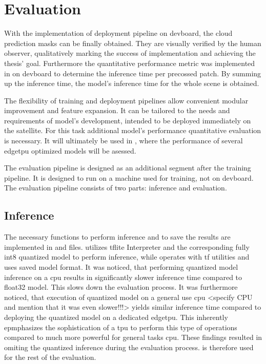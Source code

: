 {\section{Evaluation}
\label{sec:evaluation}

With the implementation of deployment pipeline on \gls{devboard}, the cloud prediction masks can be finally obtained.
They are visually verified by the human observer, qualitatively marking the success of implementation and achieving the thesis' goal.
Furthermore the quantitative performance metric was implemented in  on \gls{devboard} to determine the inference time per precossed patch.
By summing up the inference time, the model's inference time for the whole scene is obtained.

The flexibility of training and deployment pipelines allow convenient modular improvement and feature expansion.
It can be tailored to the needs and requirements of model's development, intended to be deployed immediately on the satellite.
For this task additional model's performance quantitative evaluation is necessary.
It will ultimately be used in , where the performance of several \gls{edgetpu} optimized models will be asessed.

The evaluation pipeline is designed as an additional segment after the training pipeline. It is designed to run on a machine used for training, not on \gls{devboard}.
The evaluation pipeline consists of two parts: inference and evaluation.

\subsection*{Inference}

The necessary functions to perform inference and to save the results are implemented in  and  files.
 utilizes \gls{tflite} Interpreter and the corresponding fully \gls{int8} quantized  model to perform inference,
while  operates with \gls{tf} utilities and uses  saved model format.
It was noticed, that performing quantized model inference on a \gls{cpu} results in significantly slower inference time compared to  \gls{float32} model.
This slows down the evaluation process. It was furthermore noticed,
that execution of quantized model on a general use \gls{cpu} <specify CPU and mention that it was even slower!!!> yields similar inference time
compared to deploying the quantized model on a dedicated \gls{edgetpu}. This inherently epmphasizes the sophistication of a \gls{tpu} to perform
this type of operations compared to much more powerful for general tasks \gls{cpu}. These findings resulted in omiting the quantized inference during the evaluation process.
 is therefore used for the rest of the evaluation.

}
